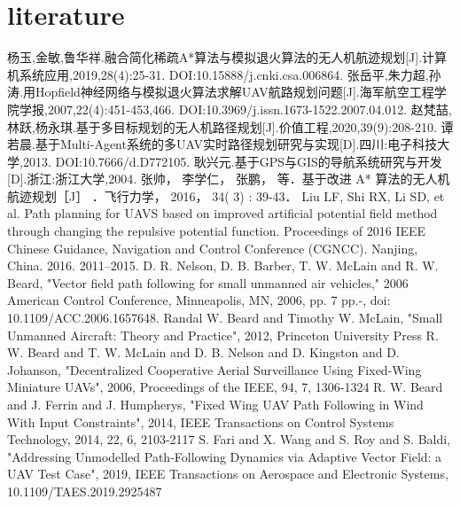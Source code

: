     \chapter{literature}
    \renewcommand{\refname}{参考文献}
    \begin{thebibliography}{99}
        \addtolength{\itemsep}{-2ex} %
        杨玉,金敏,鲁华祥.融合简化稀疏A*算法与模拟退火算法的无人机航迹规划[J].计算机系统应用,2019,28(4):25-31. DOI:10.15888/j.cnki.csa.006864.
        张岳平,朱力超,孙涛.用Hopfield神经网络与模拟退火算法求解UAV航路规划问题[J].海军航空工程学院学报,2007,22(4):451-453,466. DOI:10.3969/j.issn.1673-1522.2007.04.012.
        赵梵喆,林跃,杨永琪.基于多目标规划的无人机路径规划[J].价值工程,2020,39(9):208-210.
        谭若晨.基于Multi-Agent系统的多UAV实时路径规划研究与实现[D].四川:电子科技大学,2013. DOI:10.7666/d.D772105.
        耿兴元.基于GPS与GIS的导航系统研究与开发[D].浙江:浙江大学,2004.
        张帅， 李学仁， 张鹏， 等．基于改进 A* 算法的无人机航迹规划［J］ ．飞行力学， 2016， 34( 3) : 39-43．
        Liu LF, Shi RX, Li SD, et al. Path planning for UAVS based
        on  improved  artificial  potential  field  method  through
        changing  the  repulsive  potential  function.  Proceedings  of
        2016  IEEE  Chinese  Guidance,  Navigation  and  Control
        Conference  (CGNCC).  Nanjing,  China.  2016.  2011–2015.
        D. R. Nelson, D. B. Barber, T. W. McLain and R. W. Beard, "Vector field path following for small unmanned air vehicles," 2006 American Control Conference, Minneapolis, MN, 2006, pp. 7 pp.-, doi: 10.1109/ACC.2006.1657648.
        Randal W. Beard and Timothy W. McLain, "Small Unmanned Aircraft: Theory and Practice", 2012, Princeton University Press
        R. W. {Beard} and T. W. {McLain} and D. B. {Nelson} and D. {Kingston} and D. {Johanson}, "Decentralized Cooperative Aerial Surveillance Using Fixed-Wing Miniature {UAVs}", 2006, Proceedings of the IEEE, 94, 7, 1306-1324
        R. W. {Beard} and J. {Ferrin} and J. {Humpherys}, "Fixed Wing {UAV} Path Following in Wind With Input Constraints", 2014, IEEE Transactions on Control Systems Technology, 2014, 22, 6, 2103-2117
        S. {Fari} and X. {Wang} and S. {Roy} and S. {Baldi}, "Addressing Unmodelled Path-Following Dynamics via Adaptive Vector Field: a {UAV} Test Case", 2019, IEEE Transactions on Aerospace and Electronic Systems, 10.1109/TAES.2019.2925487
    \end{thebibliography}  